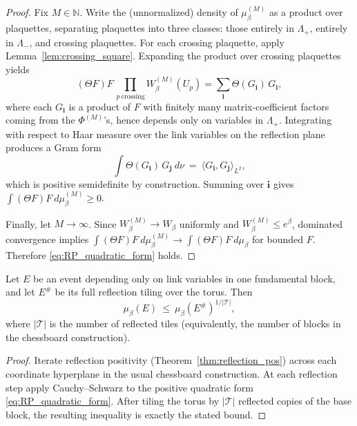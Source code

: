 \begin{proof}
Fix $M\in\mathbb N$.
Write the (unnormalized) density of $\mu_{\beta}^{(M)}$ as a product over plaquettes,
separating plaquettes into three classes: those entirely in $\Lambda_+$, entirely in $\Lambda_-$, and crossing plaquettes.
For each crossing plaquette, apply Lemma~\ref{lem:crossing_square}.
Expanding the product over crossing plaquettes yields
\[
(\Theta F)F\,\prod_{p\ \mathrm{crossing}} W_{\beta}^{(M)}(U_p)
=\sum_{\mathbf i} \Theta(G_{\mathbf i})\,G_{\mathbf i},
\]
where each $G_{\mathbf i}$ is a product of $F$ with finitely many matrix-coefficient factors coming from the $\Phi^{(M)}$'s,
hence depends only on variables in $\Lambda_+$.
Integrating with respect to Haar measure over the link variables on the reflection plane produces a Gram form
\[
\int \Theta(G_{\mathbf i})\,G_{\mathbf j}\ d\nu\ =\ \langle G_{\mathbf i},G_{\mathbf j}\rangle_{L^2},
\]
which is positive semidefinite by construction.
Summing over $\mathbf i$ gives
$\int (\Theta F)F\ d\mu_{\beta}^{(M)}\ge 0$.

Finally, let $M\to\infty$.
Since $W_{\beta}^{(M)}\to W_\beta$ uniformly and $W_{\beta}^{(M)}\le e^{\beta}$, dominated convergence implies
$\int (\Theta F)F\ d\mu_{\beta}^{(M)}\to \int (\Theta F)F\ d\mu_{\beta}$ for bounded $F$.
Therefore \eqref{eq:RP_quadratic_form} holds.
\end{proof}

\begin{lemma}\label{lem:chessboard_app}
Let $E$ be an event depending only on link variables in one fundamental block, and let $E^\#$ be its full reflection tiling over the torus.
Then
\[
\mu_\beta(E)\ \le\ \mu_\beta(E^\#)^{1/|\mathcal T|},
\]
where $|\mathcal T|$ is the number of reflected tiles (equivalently, the number of blocks in the chessboard construction).
\end{lemma}

\begin{proof}
Iterate reflection positivity (Theorem~\ref{thm:reflection_pos}) across each coordinate hyperplane in the usual chessboard construction.
At each reflection step apply Cauchy--Schwarz to the positive quadratic form \eqref{eq:RP_quadratic_form}.
After tiling the torus by $|\mathcal T|$ reflected copies of the base block, the resulting inequality is exactly the stated bound.
\end{proof}
